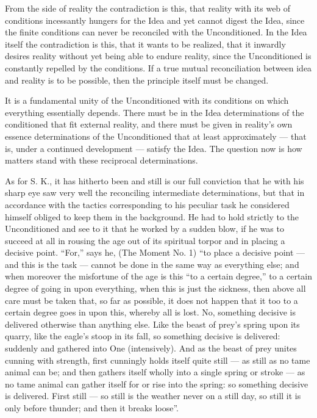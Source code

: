 \documentclass[12pt,a4paper,openany]{book}
\newcommand{\opage}[1]{\marginnote{\footnotesize\textit{[#1]}}}
\begin{document}
\setcounter{footnote}{0}%
\opage{26}From the side of reality the contradiction is this, that reality
with its web of conditions incessantly hungers
for the Idea and yet cannot digest the Idea, since the
finite conditions can never be reconciled with the Unconditioned.
In the Idea itself the contradiction is this, that it wants to
be realized, that it inwardly desires reality without
yet being able to endure reality, since the Unconditioned
is constantly repelled by the conditions. If a
true mutual reconciliation between idea and reality is to be
possible, then the principle itself must be changed.

It is a fundamental unity of the Unconditioned with its
conditions on which everything essentially depends. There must
be in the Idea determinations of the conditioned that fit
external reality, and there must be given in reality's own
essence determinations of the Unconditioned that at least
approximately --- that is, under a continued development
--- satisfy the Idea. The question now is how
matters stand with these reciprocal determinations.

As for S. K., it has hitherto been and
still is our full conviction that he with his sharp
eye saw very well the reconciling intermediate determinations,
but that in accordance with the tactics
corresponding to his peculiar task he considered himself obliged to keep them
in the background. He had to hold strictly to the Unconditioned
and see to it that he worked by a sudden blow, if
he was to succeed at all in rousing the age out of
its spiritual torpor and in placing a decisive point. ``For,'' says
he, (The Moment No. 1) ``to place a decisive point
--- and this is the task --- cannot be done
in the same way as everything else; and when moreover
the misfortune of the age is this ``to a certain degree,'' to a certain
\setcounter{footnote}{0}%
\opage{27}degree of going in upon everything, when this is just the sickness,
then above all care must be taken that, so far as possible, it does not happen that it too
to a certain degree goes in upon this, whereby all is lost. No, something decisive
is delivered otherwise than anything else. Like the beast of prey's
spring upon its quarry, like the eagle's stoop in its fall, so
something decisive is delivered: suddenly and gathered into
One (intensively). And as the beast of prey unites cunning with
strength, first cunningly holds itself quite still --- as still
as no tame animal can be; and then gathers itself wholly
into a single spring or stroke --- as no
tame animal can gather itself for or rise into the spring: so
something decisive is delivered. First still --- so still is
the weather never on a still day, so still it is only before
thunder; and then it breaks loose''.
\end{document}
